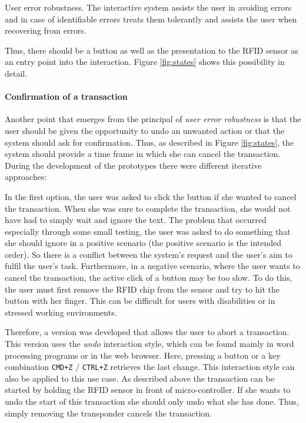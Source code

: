 \begin{principle}{User error robustness.}
The interactive system assists the user in avoiding errors and in case of identifiable errors treats them tolerantly and assists the user when recovering from errors. \cite{ISO:9241-110:2020}
\label{prin:UserErrorRobustness}
\end{principle}

Thus, there should be a button as well as the presentation to the RFID sensor as an entry point into the interaction. Figure \ref{fig:states} shows this possibility in detail.

\paragraph{Confirmation of a transaction}

Another point that emerges from the principal of \textit{user error robustness} is that the user should be given the opportunity to undo an unwanted action or that the system should ask for confirmation. Thus, as described in Figure \ref{fig:states}, the system should provide a time frame in which she can cancel the transaction. During the development of the prototypes there were different iterative approaches:

In the first option, the user was asked to click the button if she wanted to cancel the transaction. When she was sure to complete the transaction, she would not have had to simply wait and ignore the text. The problem that occurred especially through some small testing, the user was asked to do something that she should ignore in a positive scenario (the positive scenario is the intended order). So there is a conflict between the system's request and the user's aim to fulfil the user's task. Furthermore, in a negative scenario, where the user wants to cancel the transaction, the active click of a button may be too slow. To do this, the user must first remove the RFID chip from the sensor and try to hit the button with her finger. This can be difficult for users with disabilities or in stressed working environments.

Therefore, a version was developed that allows the user to abort a transaction. This version uses the \textit{undo} interaction style, which can be found mainly in word processing programs or in the web browser. Here, pressing a button or a key combination \texttt{CMD+Z} / \texttt{CTRL+Z} retrieves the last change. This interaction style can also be applied to this use case. As described above the transaction can be started by holding the RFID sensor in front of micro-controller. If she wants to undo the start of this transaction she should only undo what she has done. Thus, simply removing the transponder cancels the transaction.

